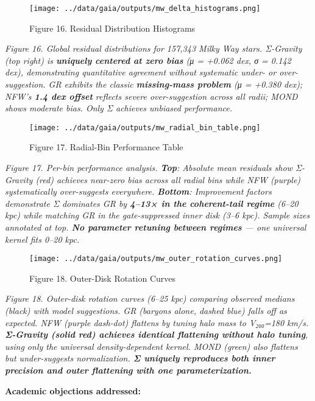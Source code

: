 \documentclass[11pt,a4paper]{article}
\begin{document}
\begin{figure}[h]
\centering
\texttt{[image: ../data/gaia/outputs/mw\_delta\_histograms.png]}
\caption{Figure 16. Residual Distribution Histograms}
\end{figure}


\textit{Figure 16. Global residual distributions for 157,343 Milky Way stars. Σ-Gravity (top right) is \textbf{uniquely centered at zero bias} (μ = +0.062 dex, σ = 0.142 dex), demonstrating quantitative agreement without systematic under- or over-suggestion. GR exhibits the classic \textbf{missing-mass problem} (μ = +0.380 dex); NFW's \textbf{1.4 dex offset} reflects severe over-suggestion across all radii; MOND shows moderate bias. Only Σ achieves unbiased performance.}


\begin{figure}[h]
\centering
\texttt{[image: ../data/gaia/outputs/mw\_radial\_bin\_table.png]}
\caption{Figure 17. Radial-Bin Performance Table}
\end{figure}


\textit{Figure 17. Per-bin performance analysis. \textbf{Top}: Absolute mean residuals show Σ-Gravity (red) achieves near-zero bias across all radial bins while NFW (purple) systematically over-suggests everywhere. \textbf{Bottom}: Improvement factors demonstrate Σ dominates GR by \textbf{4–13× in the coherent-tail regime} (6–20 kpc) while matching GR in the gate-suppressed inner disk (3–6 kpc). Sample sizes annotated at top. \textbf{No parameter retuning between regimes} — one universal kernel fits 0–20 kpc.}


\begin{figure}[h]
\centering
\texttt{[image: ../data/gaia/outputs/mw\_outer\_rotation\_curves.png]}
\caption{Figure 18. Outer-Disk Rotation Curves}
\end{figure}


\textit{Figure 18. Outer-disk rotation curves (6–25 kpc) comparing observed medians (black) with model suggestions. GR (baryons alone, dashed blue) falls off as expected. NFW (purple dash-dot) flattens by tuning halo mass to V₂₀₀=180 km/s. \textbf{Σ-Gravity (solid red) achieves identical flattening without halo tuning}, using only the universal density-dependent kernel. MOND (green) also flattens but under-suggests normalization. \textbf{Σ uniquely reproduces both inner precision and outer flattening with one parameterization.}}


\textbf{Academic objections addressed:}
\end{document}
